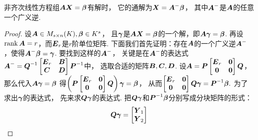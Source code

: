 \begin{theorem}[非齐次线性方程组的解的结构定理]\label{theorem:线性方程组.非齐次线性方程组的解的结构定理}
非齐次线性方程组\(\boldsymbol{A} \boldsymbol{X} = \boldsymbol\beta\)有解时，
它的通解为\(
	\boldsymbol{X} = \boldsymbol{A}^- \boldsymbol\beta
\)，
其中\(\boldsymbol{A}^-\)是\(\boldsymbol{A}\)的任意一个广义逆.
\begin{proof}
设\(
	\boldsymbol{A} \in M_{s \times n}(K),
	\boldsymbol\beta \in K^s
\)，
且\(\boldsymbol\gamma\)是\(\boldsymbol{A} \boldsymbol{X} = \boldsymbol\beta\)的一个解，即\(\boldsymbol{A} \boldsymbol\gamma = \boldsymbol\beta\).
再设\(\rank\boldsymbol{A} = r\)，而\(\boldsymbol{E}_r\)是\(r\)阶单位矩阵.
下面我们首先证明：存在\(\boldsymbol{A}\)的一个广义逆\(\boldsymbol{A}^-\)，使得\(\boldsymbol{A}^- \boldsymbol\beta = \boldsymbol\gamma\).
要找到这样的\(\boldsymbol{A}^-\)，
关键是在\(\boldsymbol{A}^-\)的表达式\(
	\boldsymbol{A}^-
	= \boldsymbol{Q}^{-1}
	\begin{bmatrix}
		\boldsymbol{E}_r & \boldsymbol{B} \\
		\boldsymbol{C} & \boldsymbol{D}
	\end{bmatrix}
	\boldsymbol{P}^{-1}
\)中，
选取合适的矩阵\(\boldsymbol{B},\boldsymbol{C},\boldsymbol{D}\).
设\(
	\boldsymbol{A}
	= \boldsymbol{P}
	\begin{bmatrix}
		\boldsymbol{E}_r & \boldsymbol0 \\
		\boldsymbol0 & \boldsymbol0
	\end{bmatrix}
	\boldsymbol{Q}
\)，
那么代入\(\boldsymbol{A} \boldsymbol\gamma = \boldsymbol\beta\)
得\(
	\left(
		\boldsymbol{P}
		\begin{bmatrix}
			\boldsymbol{E}_r & \boldsymbol0 \\
			\boldsymbol0 & \boldsymbol0
		\end{bmatrix}
		\boldsymbol{Q}
	\right)
	\boldsymbol\gamma
	= \boldsymbol\beta
\)，
从而\(
	\begin{bmatrix}
		\boldsymbol{E}_r & \boldsymbol0 \\
		\boldsymbol0 & \boldsymbol0
	\end{bmatrix}
	\boldsymbol{Q} \boldsymbol\gamma
	= \boldsymbol{P}^{-1} \boldsymbol\beta.
\)
为了求出\(\boldsymbol\gamma\)的表达式，
先来求\(\boldsymbol{Q} \boldsymbol\gamma\)的表达式.
把\(\boldsymbol{Q} \boldsymbol\gamma\)和\(\boldsymbol{P}^{-1} \boldsymbol\beta\)分别写成分块矩阵的形式：\begin{equation*}
	\boldsymbol{Q} \boldsymbol\gamma
	= \begin{bmatrix}
		\boldsymbol{Y}_1 \\ \boldsymbol{Y}_2

\end{bmatrix}
\end{equation*}
\end{proof}
\end{theorem}
